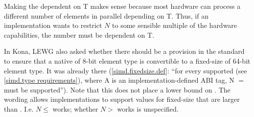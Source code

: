 Making the  dependent on \type T makes sense because most hardware can process a different number of elements in parallel depending on \type T.
Thus, if an implementation wants to restrict $N$ to some sensible multiple of the hardware capabilities, the number must be dependent on \type T.

In Kona, LEWG also asked whether there should be a provision in the standard to ensure that a native \simd of 8-bit element type is convertible to a fixed-size \simd of 64-bit element type.
It was already there (\ref{simd.fixedsize.def}: “for every supported \simd[<T, A>] (see \ref{simd.type requirements}), where \type A is an implementation-defined ABI tag, \code N $=$ \simd[<T, A>::size()] must be supported”).
Note that this does not place a lower bound on .
The wording allows implementations to support values for fixed-size \simd that are larger than .
I.e. $N \leq $  works; whether $N > $  works is unspecified.

